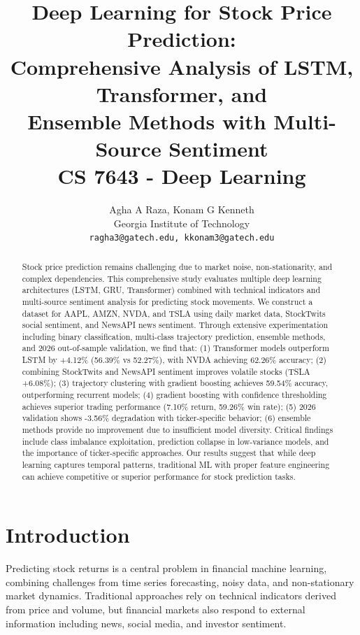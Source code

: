 \documentclass[10pt,twocolumn]{article}
\title{\textbf{Deep Learning for Stock Price Prediction:\\Comprehensive Analysis of LSTM, Transformer, and\\Ensemble Methods with Multi-Source Sentiment} \\[0.5em]
\large CS 7643 - Deep Learning}
\author{Agha A Raza, Konam G Kenneth \\
Georgia Institute of Technology \\
\texttt{ragha3@gatech.edu, kkonam3@gatech.edu}}
\date{}
\begin{document}
\maketitle

\begin{abstract}
\small
Stock price prediction remains challenging due to market noise, non-stationarity, and complex dependencies. This comprehensive study evaluates multiple deep learning architectures (LSTM, GRU, Transformer) combined with technical indicators and multi-source sentiment analysis for predicting stock movements. We construct a dataset for AAPL, AMZN, NVDA, and TSLA using daily market data, StockTwits social sentiment, and NewsAPI news sentiment. Through extensive experimentation including binary classification, multi-class trajectory prediction, ensemble methods, and 2026 out-of-sample validation, we find that: (1) Transformer models outperform LSTM by +4.12\% (56.39\% vs 52.27\%), with NVDA achieving 62.26\% accuracy; (2) combining StockTwits and NewsAPI sentiment improves volatile stocks (TSLA +6.08\%); (3) trajectory clustering with gradient boosting achieves 59.54\% accuracy, outperforming recurrent models; (4) gradient boosting with confidence thresholding achieves superior trading performance (7.10\% return, 59.26\% win rate); (5) 2026 validation shows -3.56\% degradation with ticker-specific behavior; (6) ensemble methods provide no improvement due to insufficient model diversity. Critical findings include class imbalance exploitation, prediction collapse in low-variance models, and the importance of ticker-specific approaches. Our results suggest that while deep learning captures temporal patterns, traditional ML with proper feature engineering can achieve competitive or superior performance for stock prediction tasks.
\end{abstract}

\vspace{1em}

\section{Introduction}

Predicting stock returns is a central problem in financial machine learning, combining challenges from time series forecasting, noisy data, and non-stationary market dynamics. Traditional approaches rely on technical indicators derived from price and volume, but financial markets also respond to external information including news, social media, and investor sentiment.
\end{document}
